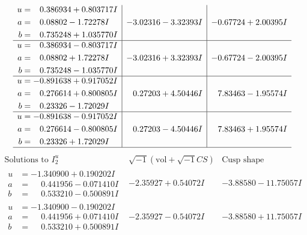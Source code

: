 \documentclass[1p]{elsarticle_modified}
\theoremstyle{definition}
\newcommand{\I}{\sqrt{-1}}
\begin{document}
$$\begin{array}{c|c|c}
\begin{aligned}
u &= \phantom{-}0.386934 + 0.803717 I \\
a &= \phantom{-}0.08802 - 1.72278 I \\
b &= \phantom{-}0.735248 + 1.035770 I\end{aligned}
 & -3.02316 - 3.32393 I & -0.67724 + 2.00395 I \\ \hline\begin{aligned}
u &= \phantom{-}0.386934 - 0.803717 I \\
a &= \phantom{-}0.08802 + 1.72278 I \\
b &= \phantom{-}0.735248 - 1.035770 I\end{aligned}
 & -3.02316 + 3.32393 I & -0.67724 - 2.00395 I \\ \hline\begin{aligned}
u &= -0.891638 + 0.917052 I \\
a &= \phantom{-}0.276614 + 0.800805 I \\
b &= \phantom{-}0.23326 - 1.72029 I\end{aligned}
 & \phantom{-}0.27203 + 4.50446 I & \phantom{-}7.83463 - 1.95574 I \\ \hline\begin{aligned}
u &= -0.891638 - 0.917052 I \\
a &= \phantom{-}0.276614 - 0.800805 I \\
b &= \phantom{-}0.23326 + 1.72029 I\end{aligned}
 & \phantom{-}0.27203 - 4.50446 I & \phantom{-}7.83463 + 1.95574 I\\
 \hline 
 \end{array}$$\newpage$$\begin{array}{c|c|c}  
\text{Solutions to }I^u_{2}& \I (\text{vol} + \sqrt{-1}CS) & \text{Cusp shape}\\
 \hline 
\begin{aligned}
u &= -1.340900 + 0.190202 I \\
a &= \phantom{-}0.441956 - 0.071410 I \\
b &= \phantom{-}0.533210 - 0.500891 I\end{aligned}
 & -2.35927 + 0.54072 I & -3.88580 - 11.75057 I \\ \hline\begin{aligned}
u &= -1.340900 - 0.190202 I \\
a &= \phantom{-}0.441956 + 0.071410 I \\
b &= \phantom{-}0.533210 + 0.500891 I\end{aligned}
 & -2.35927 - 0.54072 I & -3.88580 + 11.75057 I \\ \hline\begin{aligned}

\end{aligned}
\end{array}$$
\end{document}
